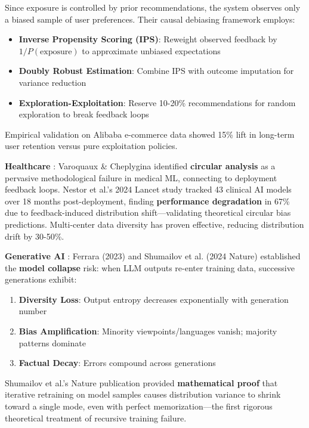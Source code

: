 \documentclass[11pt,a4paper]{article}
\begin{document}
Since exposure is controlled by prior recommendations, the system observes only a biased sample of user preferences. Their causal debiasing framework employs:
\begin{itemize}
    \item \textbf{Inverse Propensity Scoring (IPS)}: Reweight observed feedback by $1/P(\text{exposure})$ to approximate unbiased expectations
    \item \textbf{Doubly Robust Estimation}: Combine IPS with outcome imputation for variance reduction
    \item \textbf{Exploration-Exploitation}: Reserve 10-20\% recommendations for random exploration to break feedback loops
\end{itemize}

Empirical validation on Alibaba e-commerce data showed 15\% lift in long-term user retention versus pure exploitation policies.

\textbf{Healthcare} \cite{varoquaux2022,nestor2024}:  
Varoquaux \& Cheplygina \cite{varoquaux2022} identified \textbf{circular analysis} as a pervasive methodological failure in medical ML, connecting to deployment feedback loops. Nestor et al.'s \cite{nestor2024} 2024 Lancet study tracked 43 clinical AI models over 18 months post-deployment, finding \textbf{performance degradation} in 67\% due to feedback-induced distribution shift—validating theoretical circular bias predictions. Multi-center data diversity has proven effective, reducing distribution drift by 30-50\%.

\textbf{Generative AI} \cite{ferrara2023,shumailov2024,ren2024,pan2024,zhou2024}:
Ferrara \cite{ferrara2023} (2023) and Shumailov et al. \cite{shumailov2024} (2024 Nature) established the \textbf{model collapse} risk: when LLM outputs re-enter training data, successive generations exhibit:
\begin{enumerate}
    \item \textbf{Diversity Loss}: Output entropy decreases exponentially with generation number
    \item \textbf{Bias Amplification}: Minority viewpoints/languages vanish; majority patterns dominate
    \item \textbf{Factual Decay}: Errors compound across generations
\end{enumerate}

Shumailov et al.'s Nature publication \cite{shumailov2024} provided \textbf{mathematical proof} that iterative retraining on model samples causes distribution variance to shrink toward a single mode, even with perfect memorization—the first rigorous theoretical treatment of recursive training failure.
\end{document}
